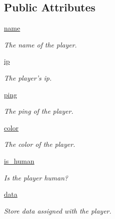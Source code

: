 \subsection*{\-Public \-Attributes}
\begin{DoxyCompactItemize}
\item 
\hyperlink{class_player_1_1_player_ae853b8b89526c79fe230c69678d62495}{name}
\begin{DoxyCompactList}\small\item\em \-The name of the player. \end{DoxyCompactList}\item 
\hyperlink{class_player_1_1_player_ae8a044ac39cb2e15fa997be7c952e9ee}{ip}
\begin{DoxyCompactList}\small\item\em \-The player's ip. \end{DoxyCompactList}\item 
\hyperlink{class_player_1_1_player_a6c97a80a0d9b94e21964461cf6acd559}{ping}
\begin{DoxyCompactList}\small\item\em \-The ping of the player. \end{DoxyCompactList}\item 
\hyperlink{class_player_1_1_player_ac6ebe6e06b9e99a15910f132592d5c10}{color}
\begin{DoxyCompactList}\small\item\em \-The color of the player. \end{DoxyCompactList}\item 
\hyperlink{class_player_1_1_player_aa327e78afb312eb9d1f19be92757f589}{is\-\_\-human}
\begin{DoxyCompactList}\small\item\em \-Is the player human? \end{DoxyCompactList}\item 
\hyperlink{class_player_1_1_player_a572e6be58205a9b53a68ad317d64c2e7}{data}
\begin{DoxyCompactList}\small\item\em \-Store data assigned with the player. \end{DoxyCompactList}\end{DoxyCompactItemize}
